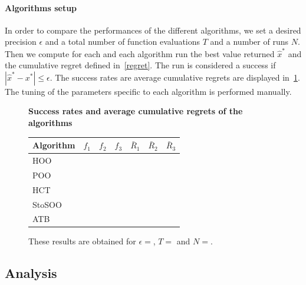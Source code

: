 \documentclass[a4paper,10pt]{article}
\begin{document}
\paragraph{Algorithms setup}
In order to compare the performances of the different algorithms, we set a desired precision $\epsilon$ and a total number of function evaluations $T$ and a number of runs $N$. Then we compute for each and each algorithm run the best value returned $\widehat{x}^*$ and the cumulative regret defined in~\ref{regret}. The run is considered a success if $|\widehat{x}^*-x^*|\le \epsilon$. The success rates are average cumulative regrets are displayed in~\ref{restab}. The tuning of the parameters specific to each algorithm is performed manually.

\begin{figure}
\label{restab}
\centering
\textbf{Success rates and average cumulative regrets of the algorithms}
\begin{tabular}{|l|c|c|c|c|c|c|}
\hline
Algorithm & $f_1$ & $f_2$ & $f_3$ & $\bar{R}_1$ & $\bar{R}_2$ & $\bar{R}_3$ \\
\hline
HOO & & & & & &\\
POO & & & & & &\\
HCT & & & & & &\\
StoSOO & & & & & &\\
ATB & & & & & &\\
\hline
\end{tabular}
\caption{These results are obtained for $\epsilon=$, $T=$ and $N=$.}
\end{figure}

\subsection{Analysis}


{}
\nocite{*}

\label{lastpage}
\end{document}
